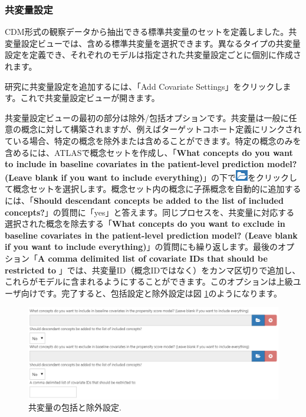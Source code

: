\documentclass[
  11pt]{book}
\theoremstyle{definition}
\theoremstyle{definition}
\theoremstyle{definition}
\theoremstyle{definition}
\theoremstyle{remark}
\begin{document}
\subsubsection*{共変量設定}\label{ux5171ux5909ux91cfux8a2dux5b9a}

CDM形式の観察データから抽出できる標準共変量のセットを定義しました。共変量設定ビューでは、含める標準共変量を選択できます。異なるタイプの共変量設定を定義でき、それぞれのモデルは指定された共変量設定ごとに個別に作成されます。

研究に共変量設定を追加するには、「Add Covariate Settings」をクリックします。これで共変量設定ビューが開きます。

共変量設定ビューの最初の部分は除外/包括オプションです。共変量は一般に任意の概念に対して構築されますが、例えばターゲットコホート定義にリンクされている場合、特定の概念を除外または含めることができます。特定の概念のみを含めるには、ATLASで概念セットを作成し、「\textbf{What concepts do you want to include in baseline covariates in the patient-level prediction model? (Leave blank if you want to include everything)}」の下で\includegraphics{images/PopulationLevelEstimation/open.png}をクリックして概念セットを選択します。概念セット内の概念に子孫概念を自動的に追加するには、「\textbf{Should descendant concepts be added to the list of included concepts?}」の質問に「yes」と答えます。同じプロセスを、共変量に対応する選択された概念を除去する「\textbf{What concepts do you want to exclude in baseline covariates in the patient-level prediction model? (Leave blank if you want to include everything)}」の質問にも繰り返します。最後のオプション「\textbf{A comma delimited list of covariate IDs that should be restricted to} 」では、共変量ID（概念IDではなく）をカンマ区切りで追加し、これらがモデルに含まれるようにすることができます。このオプションは上級ユーザ向けです。完了すると、包括設定と除外設定は図 \ref{fig:covariateSettings1}のようになります。

\begin{figure}

{\centering \includegraphics[width=1\linewidth]{images/PatientLevelPrediction/covariateSettings1} 

}

\caption{共変量の包括と除外設定.}\label{fig:covariateSettings1}
\end{figure}
\end{document}
